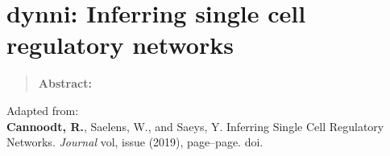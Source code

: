 \newpage{\thispagestyle{empty}\cleardoublepage}
\chapter{dynni: Inferring single cell regulatory networks} 
\label{chap:bred}

\begin{quote}
	\textbf{Abstract:} \blindtext
\end{quote}

\vfill

Adapted from:\\
\textbf{Cannoodt, R.}, Saelens, W., and Saeys, Y. Inferring Single Cell Regulatory Networks. \textit{Journal} vol, issue (2019), page--page. doi.
\newpage

\blindtext